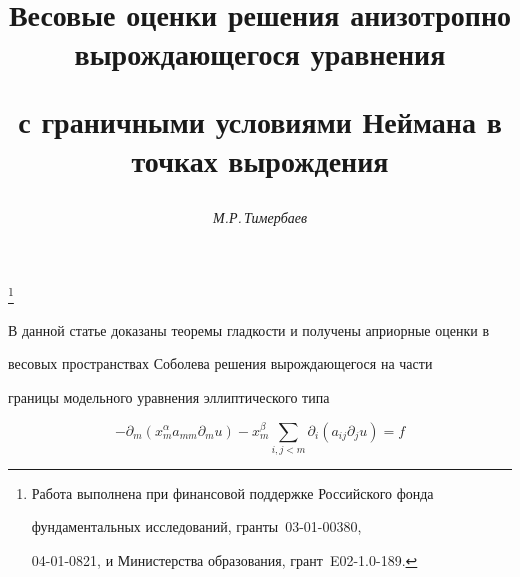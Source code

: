 








\author{\it М.Р.\,Тимербаев}




\title{Весовые оценки решения анизотропно вырождающегося уравнения


с граничными условиями Неймана в точках вырождения}


\thanks{Работа выполнена при финансовой поддержке Российского фонда


фундаментальных исследований, гранты \No\No\,03-01-00380,


04-01-0821, и Министерства образования, грант \No\,E02-1.0-189.}





\date{}




\pagestyle{plain} %







\maketitle


\label{begin}











В данной статье доказаны теоремы гладкости и получены априорные оценки в


весовых пространствах Соболева решения вырождающегося на части


границы модельного уравнения эллиптического типа


\begin{equation}\label{eq1}


-\partial_m (x_m^\alpha a_{mm}\partial_m u) - x_m^\beta


\sum_{i,j < m} \partial_i (a_{ij}\partial_j u)=f


\end{equation}


